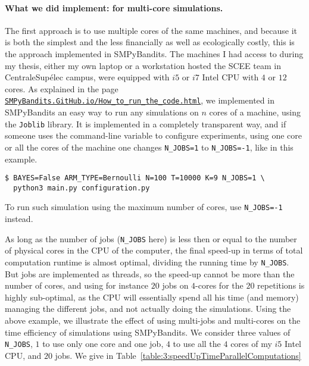\paragraph{What we did implement:  for multi-core simulations.}
%
The first approach is to use multiple cores of the same machines, and because it is both the simplest and the less financially as well as ecologically costly, this is the approach implemented in SMPyBandits.
The machines I had access to during my thesis, either my own laptop or a workstation hosted the SCEE team in CentraleSupélec campus, were equipped with $i5$ or $i7$ Intel CPU with $4$ or $12$ cores.
%
As explained in the page \href{https://smpybandits.github.io/How_to_run_the_code.html}{\texttt{SMPyBandits.GitHub.io/How\_to\_run\_the\_code.html}}, we implemented in SMPyBandits an easy way to run any simulations on $n$ cores of a machine, using the \texttt{Joblib} \cite{joblib} library.
It is implemented in a completely transparent way, and if someone uses the command-line variable to configure experiments, using one core or all the cores of the machine one changes \texttt{N\_JOBS=1} to \texttt{N\_JOBS=-1}, like in this example.

\begin{small}
    \begin{listing}[h!]
        \begin{verbatim}
$ BAYES=False ARM_TYPE=Bernoulli N=100 T=10000 K=9 N_JOBS=1 \
  python3 main.py configuration.py
        \end{verbatim}
        \caption{To run such simulation using the maximum number of cores, use \texttt{N\_JOBS=-1} instead.}
        \label{lst:3:runOneCoreOrMore}
    \end{listing}
\end{small}

As long as the number of jobs (\texttt{N\_JOBS} here) is less then or equal to the number of physical cores in the CPU of the computer, the final speed-up in terms of total computation runtime is almost optimal, dividing the running time by \texttt{N\_JOBS}.
But jobs are implemented as threads, so the speed-up cannot be more than the number of cores, and using for instance $20$ jobs on $4$-cores for the $20$ repetitions is highly sub-optimal, as the CPU will essentially spend all his time (and memory) managing the different jobs, and not actually doing the simulations.
Using the above example, we illustrate the effect of using multi-jobs and multi-cores on the time efficiency of simulations using SMPyBandits. We consider three values of \texttt{N\_JOBS}, $1$ to use only one core and one job, $4$ to use all the $4$ cores of my $i5$ Intel CPU, and $20$ jobs.
We give in Table~\ref{table:3:speedUpTimeParallelComputations}

